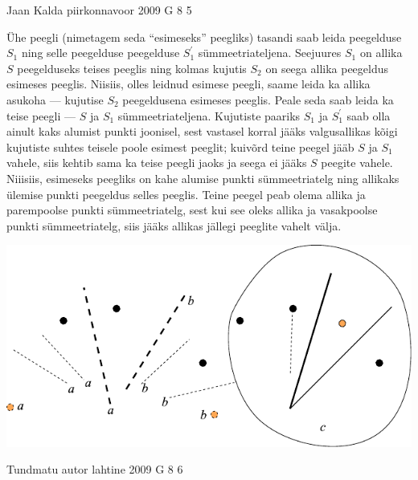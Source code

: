 \documentclass[11pt, twoside]{article}
\begin{document}
{%
{Jaan Kalda} %
{piirkonnavoor} %
{2009} %
{G 8} %
{5} %
{

\ifSolution
Ühe peegli (nimetagem seda \enquote{esimeseks} peegliks) tasandi saab leida peegelduse $S_1$ ning selle peegelduse peegelduse $S_1^\prime$ sümmeetriateljena.
Seejuures $S_1$ on allika $S$ peegelduseks teises peeglis ning kolmas kujutis $S_2$ on seega allika peegeldus esimeses peeglis. Niisiis, olles leidnud esimese peegli, saame
leida ka allika asukoha --- kujutise $S_2$ peegeldusena esimeses peeglis. Peale seda saab leida ka teise peegli --- $S$ ja $S_1$ sümmeetriateljena.
Kujutiste paariks $S_1$ ja $S_1^\prime$ saab olla ainult kaks alumist punkti joonisel, sest vastasel korral jääks valgusallikas kõigi kujutiste suhtes teisele poole esimest peeglit;
kuivõrd teine peegel jääb $S$ ja $S_1$ vahele, siis kehtib sama ka teise peegli jaoks ja seega ei jääks $S$ peegite vahele. Niiisiis, esimeseks peegliks on kahe alumise punkti sümmeetriatelg ning allikaks ülemise punkti peegeldus selles peeglis. Teine peegel peab olema allika ja parempoolse punkti sümmeetriatelg, sest kui see oleks allika ja vasakpoolse punkti sümmeetriatelg, siis jääks allikas jällegi peeglite vahelt välja.\\

\begin{center}
	\includegraphics[width=0.97\linewidth]{2009-v2g-08-lah}
\end{center}
\fi
}

{Tundmatu autor} %
{lahtine} %
{2009} %
{G 8} %
{6} %
{

}}
\end{document}
